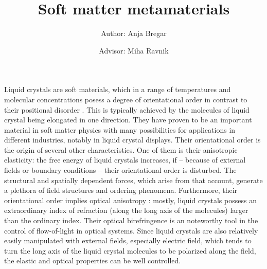 \documentclass[a4paper,11pt]{article}
\title{\huge{Soft matter metamaterials}}
\author{Author: Anja Bregar \and Advisor: Miha Ravnik}
\begin{document}
\onehalfspacing

\maketitle

% 
% 
% 
%



Liquid crystals are soft materials, which in a range of temperatures and molecular concentrations posess a degree of orientational order in contrast to their positional disorder \cite{degennes}. 
This is typically achieved by the molecules of liquid crystal being elongated in one direction.  
They have proven to be an important material in soft matter physics with many possibilities for applications in different industries, notably in liquid crystal displays.
Their orientational order is the origin of several other characteristics. 
One of them is their anisotropic elasticity: the free energy of liquid crystals increases, if -- because of external fields or boundary conditions -- their orientational order is disturbed. 
The structural and spatially dependent forces, which arise from that account, generate a plethora of field structures and ordering phenomena. 
Furthermore, their orientational order implies optical anisotropy \cite{hecht-optics}: mostly, liquid crystals possess an extraordinary index of refraction (along the long axis of the molecules) larger than the ordinary index. 
Their optical birefringence is an noteworthy tool in the control of flow-of-light in optical systems. 
Since liquid crystals are also relatively easily manipulated with external fields, especially electric field, which tends to turn the long axis of the liquid crystal molecules to be polarized along the field, the elastic and optical properties can be well controlled.



\end{document}
